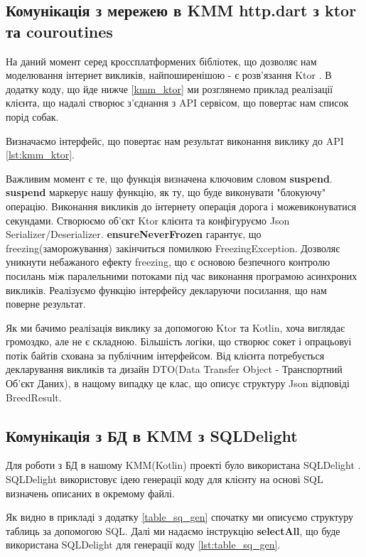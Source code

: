 \subsection{Комунікація з мережею в KMM http.dart з ktor та couroutines}
\label{subsec:kmm_ktor}
На даний момент серед кроссплатформених бібліотек, що дозволяє нам моделювання інтернет викликів,
найпоширенішою - є розв'язання Ktor \cite{ktor_home_page}.
В додатку коду, що йде нижче \ref{kmm_ktor} ми розглянемо приклад реалізації клієнта,
що надалі створює з'єднання з API сервісом, що повертає нам список порід собак.

Визначаємо інтерфейс, що повертає нам результат виконання виклику до API \ref{lst:kmm_ktor}.

Важливим момент є те, що функція визначена ключовим словом \textbf{suspend}.
\textbf{suspend} маркерує нашу функцію, як ту, що буде виконувати "блокуючу" операцію.
Виконання викликів до інтернету операція дорога і можевиконуватися секундами.
Створюємо об'єкт Ktor клієнта та конфігуруємо Json Serializer/Deserializer.
\textbf{ensureNeverFrozen} гарантує, що freezing(заморожування) закінчиться помилкою FreezingException.
Дозволяє уникнути небажаного ефекту freezing, що є основою безпечного контролю посилань між паралельними потоками
під час виконання програмою асинхроних викликів.
Реалізуємо функцію інтерфейсу декларуючи посилання, що нам поверне результат.

Як ми бачимо реалізація виклику за допомогою Ktor та Kotlin, хоча виглядає громоздко, але не є складною.
Більшість логіки, що створює сокет і опрацьовуі потік байтів схована за публічним інтерфейсом.
Від клієнта потребується декларування викликів та дизайн DTO(Data Transfer Object - Транспортний Об'єкт Даних),
в нащому випадку це клас, що описує структуру Json відповіді BreedResult.

\subsection{Комунікація з БД в KMM з SQLDelight}
\label{subsec:kmm_sqldelight}
Для роботи з БД в нашому KMM(Kotlin) проекті було використана SQLDelight \cite{sqldelight_home}.
SQLDelight використовує ідею генерації коду для клієнту на основі SQL визначень описаних в окремому файлі.

Як видно в прикладі з додатку \ref{table_sq_gen} спочатку ми описуємо структуру таблиць за допомогою SQL.
Далі ми надаємо інструкцію \textbf{selectAll}, що буде використана SQLDelight для генерації коду \ref{lst:table_sq_gen}.

